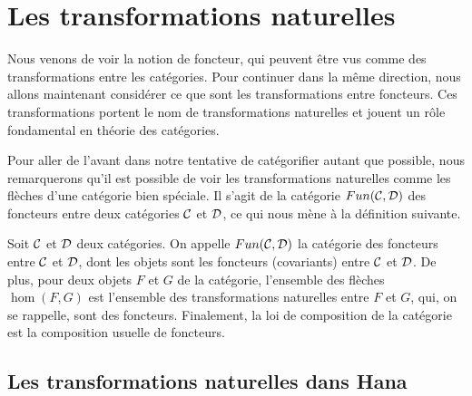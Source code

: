 \section{Les transformations naturelles}
Nous venons de voir la notion de foncteur, qui peuvent être vus comme
des transformations entre les catégories. Pour continuer dans la même
direction, nous allons maintenant considérer ce que sont les transformations
entre foncteurs. Ces transformations portent le nom de transformations
naturelles et jouent un rôle fondamental en théorie des catégories.


Pour aller de l'avant dans notre tentative de catégorifier autant que possible,
nous remarquerons qu'il est possible de voir les transformations naturelles
comme les flèches d'une catégorie bien spéciale. Il s'agit de la catégorie
$Fun(\mathcal{C}, \mathcal{D})$ des foncteurs entre deux catégories $\mathcal{C}$ et $\mathcal{D}$, ce qui nous
mène à la définition suivante.

\begin{définition}
    Soit $\mathcal{C}$ et $\mathcal{D}$ deux catégories. On appelle $Fun(\mathcal{C}, \mathcal{D})$ la catégorie
    des foncteurs entre $\mathcal{C}$ et $\mathcal{D}$, dont les objets sont les foncteurs
    (covariants) entre $\mathcal{C}$ et $\mathcal{D}$. De plus, pour deux objets $F$ et $G$ de
    la catégorie, l'ensemble des flèches $\hom(F, G)$ est l'ensemble des
    transformations naturelles entre $F$ et $G$, qui, on se rappelle, sont
    des foncteurs. Finalement, la loi de composition de la catégorie est
    la composition usuelle de foncteurs.
\end{définition}


\subsection{Les transformations naturelles dans Hana}
